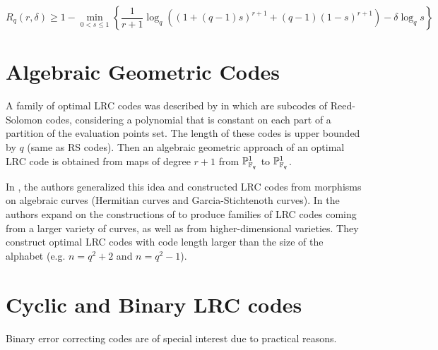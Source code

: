 \begin{equation}
R_q (r,\delta) \geq 1 - \min_{0 < s \leq 1} \left\lbrace \frac{1}{r+1}\log_q ((1+(q-1)s)^{r+1}+(q-1)(1-s)^{r+1})-\delta \log_q s \right\rbrace
\end{equation}

\section{Algebraic Geometric Codes}

A family of optimal LRC codes was described by \citeauthor{optimal_LRC} in \cite{optimal_LRC} which are subcodes of Reed-Solomon codes, considering a polynomial that is constant on each part of a partition of the evaluation points set. The length of these codes is upper bounded by $q$ (same as RS codes). Then an algebraic geometric approach of an optimal LRC code is obtained from maps of degree $r+1$ from ${\mathbb P}^1_{{\mathbb F}_q}$ to ${\mathbb P}^1_{{\mathbb F}_q}$.

In \cite{LRC_on_alg_curves}, the authors generalized this idea and constructed LRC codes from morphisms on algebraic curves (Hermitian curves and Garcia-Stichtenoth curves). In \cite{LRC_on_alg_curves2} the authors expand on the constructions of \cite{LRC_on_alg_curves} to produce families of LRC codes coming from a larger variety of curves, as well as from higher-dimensional varieties. They construct optimal LRC codes with code length larger than the size of the alphabet (e.g. $n = q^2 + 2$ and $n = q^2 - 1$).

%
%
%

\section{Cyclic and Binary LRC codes}
Binary error correcting codes are of special interest due to practical reasons.

